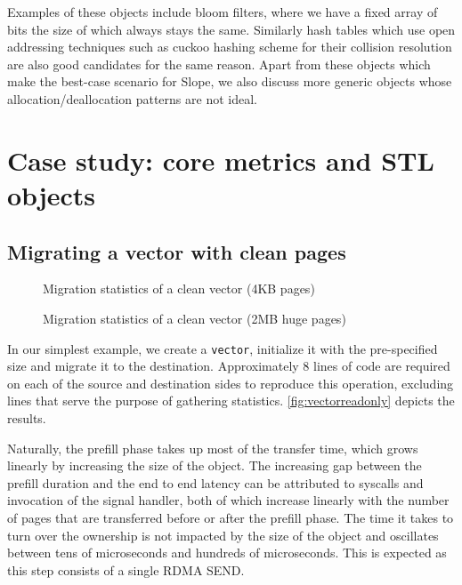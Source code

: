 Examples of these objects include bloom filters, where we have a fixed
array of bits the size of which always stays the same.
Similarly hash tables which use open addressing techniques such as cuckoo
hashing scheme for their collision resolution are also good candidates for the
same reason.
Apart from these objects which make the best-case scenario for Slope, we also
discuss more generic objects whose allocation/deallocation patterns are not
ideal.

\section{Case study: core metrics and STL objects}
\subsection{Migrating a vector with clean pages}
\label{sec:cleanvec}

\begin{figure}[tp]
    \begin{center}
        
    \end{center}
    \caption{Migration statistics of a clean vector (4KB pages)}
    \label{fig:vectorreadonly}
\end{figure}

\begin{figure}[tp]
    \begin{center}
        
    \end{center}
    \caption{Migration statistics of a clean vector (2MB huge pages)}
    \label{fig:vectorreadonlyhp}
\end{figure}

In our simplest example, we create a \texttt{vector}, initialize it with the
pre-specified size and migrate it to the destination. Approximately $8$ lines
of code are required on each of the source and destination sides to reproduce
this operation, excluding lines that serve the purpose of gathering statistics.
\autoref{fig:vectorreadonly} depicts the results.

Naturally, the prefill phase takes up most of the transfer time, which grows
linearly by increasing the size of the object. The increasing gap between the
prefill duration and the end to end latency can be attributed to syscalls and
invocation of the signal handler, both of which increase linearly with the
number of pages that are transferred before or after the prefill phase. The
time it takes to turn over the ownership is not impacted by the
size of the object and oscillates between tens of microseconds and hundreds
of microseconds. This is expected as this step consists of a single RDMA SEND.

